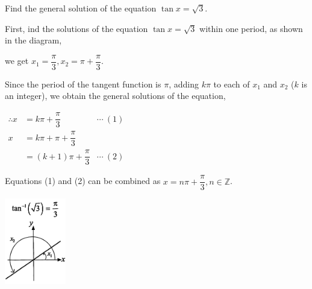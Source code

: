\documentclass{report}
\begin{document}
\begin{question}
	Find the general solution of the equation $\tan x=\sqrt{3}$.
	
	\sol{}
	\begin{vwcol}[widths={0.6,0.4}, sep=0.8cm, justify=flush,rule=0pt]
		\noindent First, ind the solutions of the equation $\tan x = \sqrt{3}$ within one period, as shown in the diagram,
		
		\noindent we get $x_1=\dfrac{\pi}{3}, x_2=\pi+\dfrac{\pi}{3}$.
		
		\noindent Since the period of the tangent function is $\pi$, adding $k\pi$ to each of $x_1$ and $x_2$ ($k$ is an integer), we obtain the general solutions of the equation,
		
		\vspace{1em}
		\noindent $
		\begin{aligned}
			\therefore x & =k\pi+\dfrac{\pi}{3}     & \cdots\ (1) \\
			x & =k\pi+\pi+\dfrac{\pi}{3} \\
			             & =(k+1)\pi+\dfrac{\pi}{3} & \cdots\ (2) 
		\end{aligned}
		$
		
		\noindent Equations (1) and (2) can be combined as $x=n\pi+\dfrac{\pi}{3}, n \in \mathbb{Z}$.
		\vspace{2em}
		
		\includegraphics[width=0.2\textwidth]{assets/11-15.jpg}
	\end{vwcol}
\end{question}
\end{document}
